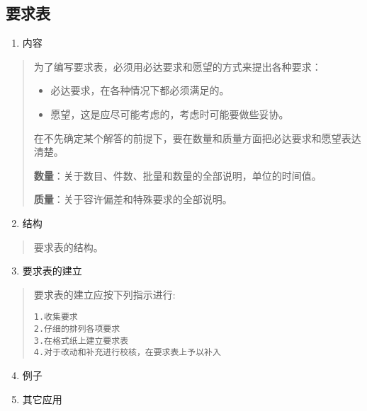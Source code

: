 \documentclass[letterpaper,10pt,english]{sphinxmanual}
\begin{document}
\subsection{要求表}
\label{unit4:id12}\begin{enumerate}
\item {} 
内容

\end{enumerate}
\begin{quote}

为了编写要求表，必须用必达要求和愿望的方式来提出各种要求：
\begin{itemize}
\item {} 
必达要求，在各种情况下都必须满足的。

\item {} 
愿望，这是应尽可能考虑的，考虑时可能要做些妥协。

\end{itemize}

在不先确定某个解答的前提下，要在数量和质量方面把必达要求和愿望表达清楚。

\textbf{数量}：关于数目、件数、批量和数量的全部说明，单位的时间值。

\textbf{质量}：关于容许偏差和特殊要求的全部说明。
\end{quote}
\begin{enumerate}
\setcounter{enumi}{1}
\item {} 
结构

\end{enumerate}
\begin{quote}

要求表的结构。
\end{quote}
\begin{enumerate}
\setcounter{enumi}{2}
\item {} 
要求表的建立

\end{enumerate}
\begin{quote}

要求表的建立应按下列指示进行:

\begin{Verbatim}[commandchars=\\\{\}]
1.收集要求
2.仔细的排列各项要求
3.在格式纸上建立要求表
4.对于改动和补充进行校核，在要求表上予以补入
\end{Verbatim}
\end{quote}
\begin{enumerate}
\setcounter{enumi}{3}
\item {} 
例子

\item {} 
其它应用

\end{enumerate}
\end{document}
